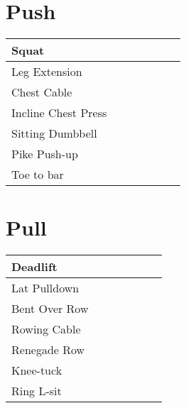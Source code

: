 \documentclass{article}
\begin{document}
\begin{landscape}

\section*{Push}

\huge
\noindent\begin{tabularx}{\columnwidth}{ |l|*{6}{R|} }
  \hline
  Squat                            &&&&&&    \\
  \hline
  Leg Extension                    &&&&&&    \\
  \hline
  Chest Cable                      &&&&&&    \\
  \hline
  Incline Chest Press              &&&&&&    \\
  \hline
  Sitting Dumbbell                 &&&&&&    \\
  \hline
  Pike Push-up                     &&&&&&    \\
  \hline
  Toe to bar                       &&&&&&    \\
  \hline
\end{tabularx}

\pagebreak

\section*{Pull}

\noindent\begin{tabularx}{\columnwidth}{ |l|*{6}{R|} }
  \hline
  Deadlift                         &&&&&&    \\
  \hline
  Lat Pulldown                     &&&&&&    \\
  \hline
  Bent Over Row                    &&&&&&    \\
  \hline
  Rowing Cable                     &&&&&&    \\
  \hline
  Renegade Row                     &&&&&&    \\
  \hline
  Knee-tuck                        &&&&&&    \\
  \hline
  Ring L-sit                        &&&&&&    \\
  \hline
\end{tabularx}

\end{landscape}
\end{document}
